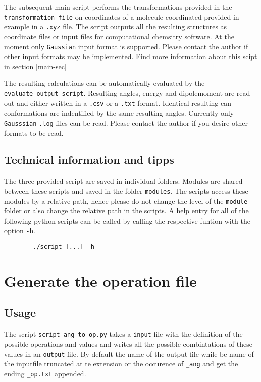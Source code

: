 \documentclass[parskip]{scrartcl}
\begin{document}
        The subsequent main script performs the transformations provided in the 
        \texttt{transformation file} on coordinates of a
        molecule coordinated provided in example in a \texttt{.xyz} file. The script outputs
        all the resulting structures as coordinate files or input files for computational
        chemsitry software. At the moment only \texttt{Gaussian} input format is supported.
        Please contact the author if other input formats may be implemented.
        Find more information about this scipt in section \ref{main-sec}

        The resulting calculations can be automatically evaluated by the 
        \texttt{evaluate\_output\_script}. Resulting angles, energy and dipolemoment are read
        out and either written in a \texttt{.csv} or a \texttt{.txt} format. Identical
        resulting can conformations are indentified by the same resulting angles. 
        Currently only \texttt{Gausssian} \texttt{.log}
        files can be read. Please contact the author if you desire other formats to be read.

    \subsection{Technical information and tipps}
        The three provided script are saved in individual folders. Modules are shared between
        these scripts and saved in the folder \texttt{modules}. The scripts access these
        modules by a relative path, hence please do not change the level of the
        \texttt{module} folder or also change the relative path in the scripts.
        A help entry for all of the following python scripts can be called
        by calling the respective
        funtion with the option \texttt{-h}.
        \begin{verbatim}
        ./script_[...] -h
        \end{verbatim}



\section{Generate the operation file}
    \subsection{Usage}
        The script \texttt{script\_ang-to-op.py} takes a \texttt{input} file with 
        the definition of    the possible operations and
        values and writes all the possible combintations of these values in an 
        \texttt{output} file. By default the name of the output file while be name of the
        inputfile truncated at te extension or the occurence of \texttt{\_ang} and get the
        ending \texttt{\_op.txt} appended.
\end{document}
